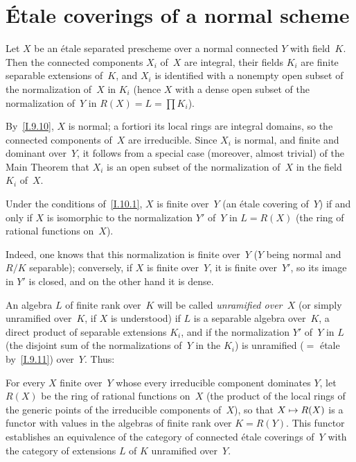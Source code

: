 \section{\'Etale coverings of a normal scheme}
\label{I.10}

\begin{proposition}
\label{I.10.1}
Let $X$ be an \'etale separated prescheme over a normal
connected $Y$ with field~$K$. Then the
connected components $X_i$ of~$X$ are integral, their
fields $K_i$ are finite separable extensions of~$K$,
and $X_i$ is identified with a nonempty open subset of
the normalization of~$X$ in $K_i$ (hence $X$ with a
dense open subset of the normalization of~$Y$ in
$R(X)=L=\prod K_i$).
\end{proposition}

By~\ref{I.9.10}, $X$ is normal; a fortiori its local
rings are integral domains, so the connected components
of~$X$ are irreducible. Since $X_i$ is normal, and finite
and dominant over~$Y$, it follows from a special case
(moreover, almost trivial) of the Main Theorem that
$X_i$ is an open subset of the normalization of~$X$
in the field $K_i$ of~$X$.

\begin{corollary}
\label{I.10.2}
Under the conditions of~\ref{I.10.1}, $X$ is finite
over~$Y$ (\ie an \'etale covering of~$Y$) if and only
if $X$ is isomorphic to the normalization $Y'$ of~$Y$
in $L=R(X)$ (the ring of rational functions on~$X$).
\end{corollary}

Indeed, one knows that this normalization is finite
over~$Y$ ($Y$ being normal and $R/K$ separable);
conversely, if $X$ is finite over~$Y$, it is finite
over~$Y'$, so its image in $Y'$ is closed, and on
the other hand it is dense.

An algebra $L$ of finite rank over~$K$ will be called
\emph{unramified over~$X$} (or simply unramified
over~$K$, if $X$ is understood) if $L$ is a separable
algebra over~$K$, \ie a direct product of separable
extensions $K_i$, and if the normalization $Y'$ of~$Y$
in $L$ (the disjoint sum of the normalizations of~$Y$
in the $K_i$) is unramified ($=$ \'etale by~\ref{I.9.11})
over~$Y$. Thus:

\begin{corollary}
\label{I.10.3}
For every $X$ finite over~$Y$ whose every irreducible
component dominates $Y$, let $R(X)$ be the ring of
rational functions on~$X$ (the product of the local
rings of the generic points of the irreducible
components of~$X$), so that $X\mto R(X)$ is a functor
with values in the algebras of finite rank over
$K=R(Y)$. This functor establishes an equivalence of
the category of connected \'etale coverings of~$Y$
with the category of extensions $L$ of $K$ unramified
over~$Y$.
\end{corollary}

